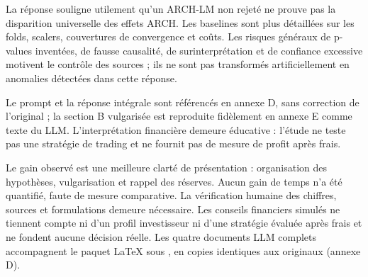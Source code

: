La réponse souligne utilement qu’un ARCH-LM non rejeté ne prouve pas la disparition universelle des effets ARCH. Les baselines sont plus détaillées sur les folds, scalers, couvertures de convergence et coûts. Les risques généraux de p-values inventées, de fausse causalité, de surinterprétation et de confiance excessive motivent le contrôle des sources ; ils ne sont pas transformés artificiellement en anomalies détectées dans cette réponse.



Le prompt et la réponse intégrale sont référencés en annexe D, sans correction de l’original ; la section B vulgarisée est reproduite fidèlement en annexe E comme texte du LLM. L’interprétation financière demeure éducative : l’étude ne teste pas une stratégie de trading et ne fournit pas de mesure de profit après frais.

Le gain observé est une meilleure clarté de présentation : organisation des hypothèses, vulgarisation et rappel des réserves. Aucun gain de temps n’a été quantifié, faute de mesure comparative. La vérification humaine des chiffres, sources et formulations demeure nécessaire. Les conseils financiers simulés ne tiennent compte ni d’un profil investisseur ni d’une stratégie évaluée après frais et ne fondent aucune décision réelle. Les quatre documents LLM complets accompagnent le paquet LaTeX sous , en copies identiques aux originaux (annexe D).
